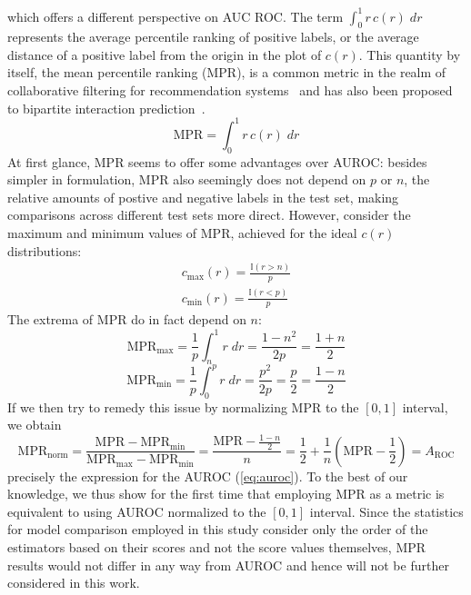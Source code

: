 %
which offers a different perspective on AUC ROC.  %
%
The term $\int_{0}^{1} r\,c(r) \;dr$ represents the average percentile ranking of positive labels, or the average distance of a positive label from the origin in the plot of $c(r)$. This quantity by itself, the mean percentile ranking (MPR), is a common metric in the realm of collaborative filtering for recommendation systems~\cite{hu2008collaborative,johnsonlogistic} and has also been proposed to bipartite interaction prediction~\cite{ezzat2019computational,hao2019opensource,yu2020fpscdti}.
%
\begin{equation}
    \text{MPR} = \int_0^1 r\,c(r) \;dr
\end{equation}
%
At first glance, MPR seems to offer some advantages over AUROC: besides simpler in formulation, MPR also seemingly does not depend on $p$ or $n$, the relative amounts of postive and negative labels in the test set, making comparisons across different test sets more direct. However, consider the maximum and minimum values of MPR, achieved for the ideal $c(r)$ distributions:
%
\begin{gather}
    c_\text{max}(r) = \frac{\mathbb{I}(r > n)}{p}\\
    c_\text{min}(r) = \frac{\mathbb{I}(r < p)}{p}
\end{gather}
%
The extrema of MPR do in fact depend on $n$:
%
\begin{equation}
    \text{MPR}_\text{max}
        = \frac{1}{p}\int_n^1 r \;dr
        = \frac{1 - n^2}{2p}
        = \frac{1 + n}{2}
\end{equation}
%
\begin{equation}
    \text{MPR}_\text{min}
        = \frac{1}{p}\int_0^p r \;dr
        = \frac{p^2}{2p}
        = \frac{p}{2}
        = \frac{1 - n}{2}
\end{equation}
%
If we then try to remedy this issue by normalizing MPR to the $[0, 1]$ interval, we obtain
\begin{equation}
    \text{MPR}_\text{norm}
        = \frac{
            \text{MPR} - \text{MPR}_\text{min}
        }{
            \text{MPR}_\text{max} - \text{MPR}_\text{min}
        }
        = \frac{\text{MPR} - \frac{1 - n}{2}}{n}
        = \frac{1}{2} + \frac{1}{n}\left(\text{MPR} - \frac{1}{2}\right)
        = A_\text{ROC}
\end{equation}
%
precisely the expression for the AUROC (\autoref{eq:auroc}). To the best of our knowledge, we thus show for the first time that employing MPR as a metric is equivalent to using AUROC normalized to the $[0, 1]$ interval. Since the statistics for model comparison employed in this study consider only the order of the estimators based on their scores and not the score values themselves, MPR results would not differ in any way from AUROC and hence will not be further considered in this work.

